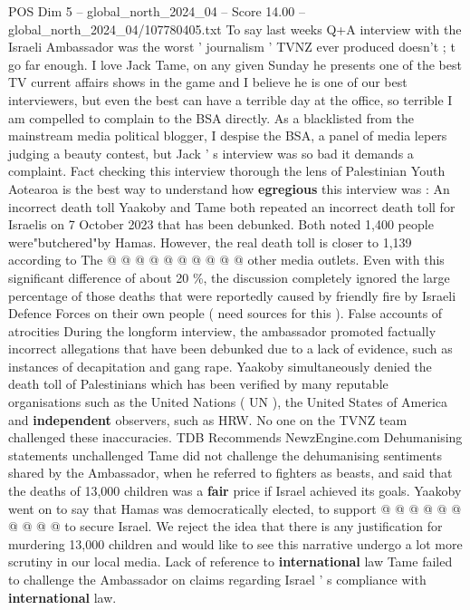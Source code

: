 \begin{textsample}{POS Dim 5 – global\_north\_2024\_04 – Score 14.00 – global\_north\_2024\_04/107780405.txt}  \label{ex:f5_pos_287}
To say last weeks Q+A interview with the Israeli Ambassador was the worst ' journalism ' TVNZ ever produced doesn't ; t go far enough.
I love Jack Tame, on any given Sunday he presents one of the best TV current affairs shows in the game and I believe he is one of our best interviewers, but even the best can have a terrible day at the office, so terrible I am compelled to complain to the BSA directly.
As a blacklisted from the mainstream media political blogger, I despise the BSA, a panel of media lepers judging a beauty contest, but Jack ' s interview was so bad it demands a complaint.
Fact checking this interview thorough the lens of Palestinian Youth Aotearoa is the best way to understand how \textbf{egregious} this interview was : An incorrect death toll Yaakoby and Tame both repeated an incorrect death toll for Israelis on 7 October 2023 that has been debunked.
Both noted 1,400 people were"butchered"by Hamas.
However, the real death toll is closer to 1,139 according to The @ @ @ @ @ @ @ @ @ @ other media outlets.
Even with this significant difference of about 20 \%, the discussion completely ignored the large percentage of those deaths that were reportedly caused by friendly fire by Israeli Defence Forces on their own people ( need sources for this ).
False accounts of atrocities During the longform interview, the ambassador promoted factually incorrect allegations that have been debunked due to a lack of evidence, such as instances of decapitation and gang rape.
Yaakoby simultaneously denied the death toll of Palestinians which has been verified by many reputable organisations such as the United Nations ( UN ), the United States of America and \textbf{independent} observers, such as HRW.
No one on the TVNZ team challenged these inaccuracies.
TDB Recommends NewzEngine.com Dehumanising statements unchallenged Tame did not challenge the dehumanising sentiments shared by the Ambassador, when he referred to fighters as beasts, and said that the deaths of 13,000 children was a \textbf{fair} price if Israel achieved its goals.
Yaakoby went on to say that Hamas was democratically elected, to support @ @ @ @ @ @ @ @ @ @ to secure Israel.
We reject the idea that there is any justification for murdering 13,000 children and would like to see this narrative undergo a lot more scrutiny in our local media.
Lack of reference to \textbf{international} law Tame failed to challenge the Ambassador on claims regarding Israel ' s compliance with \textbf{international} law.

\end{textsample}
